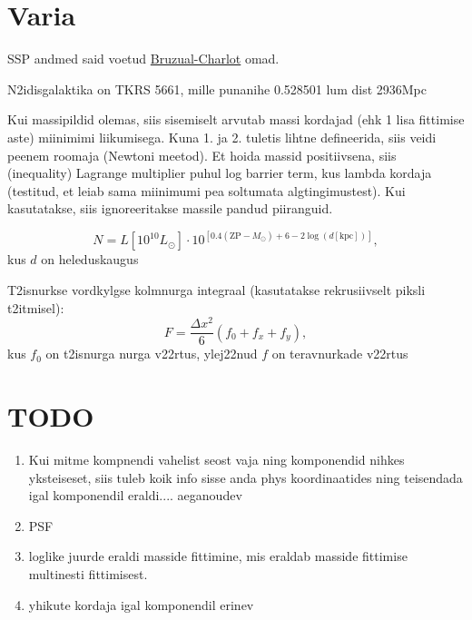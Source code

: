 \documentclass{article}
\begin{document}
	\section{Varia} %
	\label{sec:varia}
	
	SSP andmed said voetud \href{http://www.bruzual.org/bc03/Updated_version_2016/}{Bruzual-Charlot} omad.
	
	N2idisgalaktika on TKRS 5661, mille punanihe 0.528501 lum dist 2936Mpc
	
	Kui massipildid olemas, siis sisemiselt arvutab massi kordajad (ehk 1 lisa fittimise aste) miinimimi liikumisega. Kuna 1. ja 2. tuletis lihtne defineerida, siis veidi peenem roomaja (Newtoni meetod). Et hoida massid positiivsena, siis (inequality) Lagrange multiplier puhul log barrier term, kus lambda kordaja (testitud, et leiab sama miinimumi pea soltumata algtingimustest). Kui kasutatakse, siis ignoreeritakse massile pandud piiranguid. 
	
	
	\begin{equation}
		N = L\left[ 10^{10}L_\odot \right] \cdot 10^{\left[ 0.4(\mathrm{ZP}-M_\odot) +6 - 2\log(d[\mathrm{kpc}]) \right]},
	\end{equation}
	kus $d$ on heleduskaugus
	
	T2isnurkse vordkylgse kolmnurga integraal (kasutatakse rekrusiivselt piksli t2itmisel):
	\begin{equation}
		F = \frac{\Delta x^2}{6}(f_0+f_x+f_y),
	\end{equation}
	kus $f_0$ on t2isnurga nurga v22rtus, ylej22nud $f$ on teravnurkade v22rtus
	
	
	
	
	
	\section{TODO} %
	\label{sec:todo}
	\begin{enumerate}
		\item Kui mitme kompnendi vahelist seost vaja ning komponendid nihkes yksteiseset, siis tuleb koik info sisse anda phys koordinaatides ning teisendada igal komponendil eraldi.... aeganoudev
		\item PSF
		\item loglike juurde eraldi masside fittimine, mis eraldab masside fittimise multinesti fittimisest.
		\item yhikute kordaja igal komponendil erinev
	\end{enumerate}
	
\end{document}
